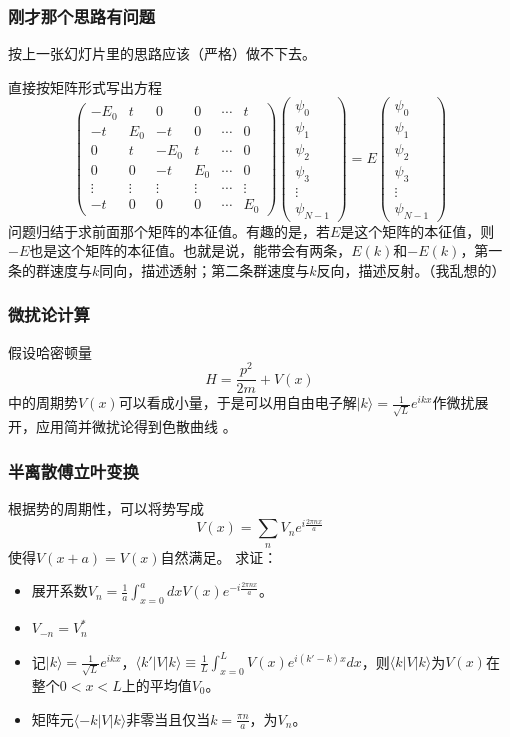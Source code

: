\documentclass[CJK]{beamer}
\begin{document}
\begin{frame}
\frametitle{\bch 刚才那个思路有问题 \ech}
\bch
按上一张幻灯片里的思路应该（严格）做不下去。
\par
直接按矩阵形式写出方程
$$
\begin{pmatrix}
-E_0 & t & 0 & 0 & \cdots & t \\
-t & E_0 & -t & 0 & \cdots & 0 \\
0 & t & -E_0 & t & \cdots &0 \\
0 & 0 & -t & E_0 & \cdots & 0 \\
\vdots & \vdots & \vdots & \vdots &\cdots & \vdots \\
-t & 0 & 0 & 0 & \cdots &E_0
\end{pmatrix}
\begin{pmatrix}
\psi_0 \\ \psi_1 \\ \psi_2 \\ \psi_3 \\ \vdots \\ \psi_{N-1}
\end{pmatrix}
= E \begin{pmatrix}
\psi_0 \\ \psi_1 \\ \psi_2 \\ \psi_3 \\ \vdots \\ \psi_{N-1}
\end{pmatrix}
$$
问题归结于求前面那个矩阵的本征值。有趣的是，若$E$是这个矩阵的本征值，则$-E$也是这个矩阵的本征值。也就是说，能带会有两条，$E(k)$和$-E(k)$，第一条的群速度与$k$同向，描述透射；第二条群速度与$k$反向，描述反射。（我乱想的）
\ech
\end{frame}





\begin{frame}
\frametitle{\bch 微扰论计算 \ech}
\bch
假设哈密顿量
$$
H = \frac{p^2}{2m} + V(x)
$$
中的周期势$V(x)$可以看成小量，于是可以用自由电子解$|k\rangle = \frac{1}{\sqrt{L}}e^{ikx}$作微扰展开，应用简并微扰论得到色散曲线
。
\ech
\end{frame}

\begin{frame}
\frametitle{\bch 半离散傅立叶变换 \ech}
\bch
根据势的周期性，可以将势写成
$$
V(x) = \sum_n V_n e^{i\frac{2\pi n x}{a}}
$$
使得$V(x+a) = V(x)$自然满足。
求证：
\begin{itemize}
\item 展开系数$V_n = \frac{1}{a} \int_{x=0}^a dx V(x) e^{-i\frac{2\pi n x}{a}}$。
\item $V_{-n} = V_n^*$
\item 记$|k\rangle = \frac{1}{\sqrt{L}}e^{ikx}$，$\langle k' | V | k \rangle \equiv \frac{1}{L} \int_{x=0}^L V(x) e^{i(k'-k)x} dx$，则$\langle k | V | k \rangle$为$V(x)$在整个$0<x<L$上的平均值$V_0$。
\item 矩阵元$\langle -k | V | k \rangle$非零当且仅当$k =\frac{\pi n}{a}$，为$V_n$。
\end{itemize}
\ech
\end{frame}
\end{document}
